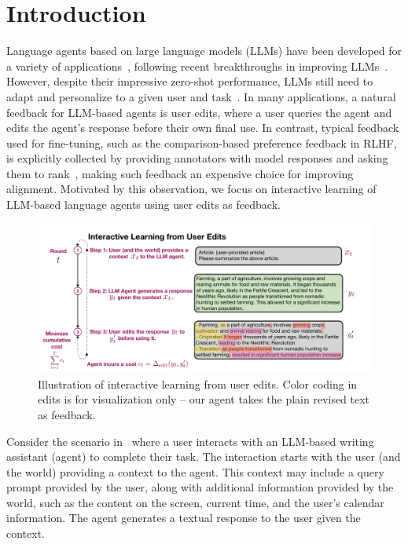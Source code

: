 \section{Introduction}


Language agents based on large language models (LLMs) have been developed for a variety of applications~\citep{githubcopilot,brynjolfsson2023generative}, following recent breakthroughs in improving LLMs~\citep{achiam2023gpt,ouyang2022training,team2023gemini}. However, despite their impressive zero-shot performance, LLMs still need to adapt and personalize to a given user and task~\citep{mysore2023pearl,li2023automatic}. In many applications, a natural feedback for LLM-based agents is user edits, where a user queries the agent and edits the agent's response before their own final use. In contrast, typical feedback used for fine-tuning, such as the comparison-based preference feedback in RLHF, is explicitly collected by providing annotators with model responses and asking them to rank~\citep[inter alia]{Ziegler2019FineTuningLM,Stiennon2020LearningTS,Nakano2021WebGPTBQ,Ouyang2022TrainingLM}, making such feedback an expensive choice for improving alignment. Motivated by this observation, we focus on interactive learning of LLM-based language agents using user edits as feedback.



\begin{figure}[!t]
    \centering
    \vspace{-10pt}
    \includegraphics[clip, trim=1cm 0.5cm 3.5cm 1cm, width=1.00\textwidth]{graphs/main_diagram_vertical.pdf} 
    \caption{Illustration of interactive learning from user edits. Color coding in edits is for visualization only -- our agent takes the plain revised text as feedback. }
    \label{fig:main}
    \vspace{-15pt}
\end{figure}

Consider the scenario in~ where a user interacts with an LLM-based writing assistant (agent) to complete their task. The interaction starts with the user (and the world) providing a context to the agent. This context may include a query prompt provided by the user, along with additional information provided by the world, such as the content on the screen, current time, and the user's calendar information. The agent generates a textual response to the user given the context.

